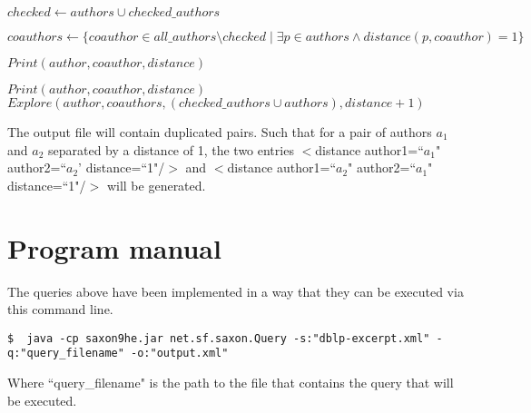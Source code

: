 \documentclass{article}
\begin{document}
\begin{algorithm}[H]
\caption{$Explore(author, authors, checked\_authors, distance)$}
\begin{algorithmic}

\STATE $checked \gets authors \cup checked\_authors$

\STATE $coauthors \gets \{coauthor \in all\_authors \setminus checked \mid \exists p \in authors \wedge distance(p, coauthor) = 1\}$

        \STATE $Print(author, coauthor, distance)$
    \ENDFOR

\ELSE
        \STATE $Print(author, coauthor, distance)$
    \ENDFOR
    \STATE $Explore(author, coauthors, (checked\_authors \cup authors), distance + 1)$
\ENDIF

\end{algorithmic}
\end{algorithm}

The output file will contain duplicated pairs. Such that for a pair of authors $a_1$ and $a_2$ separated by a distance of 1, the two entries $<$distance author1=``$a_1$" author2=``$a_2$' distance=``1"/$>$ and $<$distance author1=``$a_2$" author2=``$a_1$" distance=``1"/$>$ will be generated.

\section{Program manual}

The queries above have been implemented in a way that they can be executed via this command line.

\begin{lstlisting}[frame=lines]
    $  java -cp saxon9he.jar net.sf.saxon.Query -s:"dblp-excerpt.xml" -q:"query_filename" -o:"output.xml"
\end{lstlisting}

Where ``query\_filename" is the path to the file that contains the query that will be executed.
\end{document}
